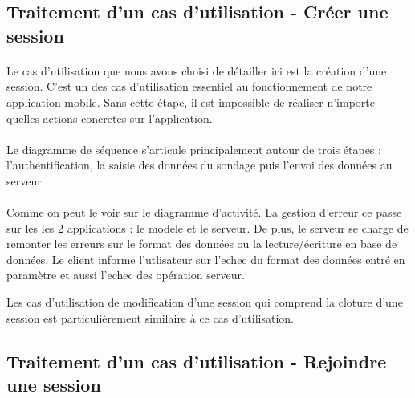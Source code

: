 \documentclass[titlepage, 12pt]{report}
\begin{document}

\subsection{Traitement d'un cas d'utilisation - Créer une session}

\paragraph{}Le cas d'utilisation que nous avons choisi de détailler ici est la création d'une session. C'est un des cas d'utilisation essentiel au fonctionnement de notre application mobile. Sans cette étape, il est impossible de réaliser n'importe quelles actions concretes sur l'application.
\paragraph{}Le diagramme de séquence s'articule principalement autour de trois étapes : l'authentification, la saisie des données du sondage puis l'envoi des données au serveur.


\paragraph{}Comme on peut le voir sur le diagramme d'activité. La gestion d'erreur ce passe sur les les 2 applications : le modele et le serveur. De plus, le serveur se charge de remonter les erreurs sur le format des données ou la lecture/écriture en base de données. Le client informe l'utlisateur sur l'echec du format des données entré en paramètre et aussi l'echec des opération serveur.


Les cas d'utilisation de modification d'une session qui comprend la cloture d'une session est particulièrement similaire à ce cas d'utilisation.



\subsection{Traitement d'un cas d'utilisation - Rejoindre une session}
\end{document}
